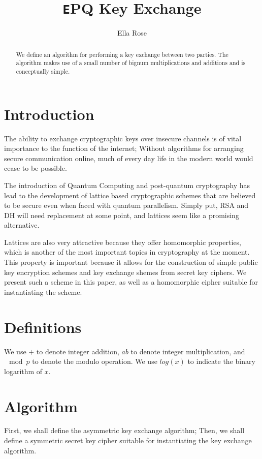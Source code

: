 \documentclass[preprint]{iacrtrans}
\author{Ella Rose\inst{1}}
\institute{Paso Robles, CA \email{python_pride@protonmail.com}}
\title[\texttt EPQ Key Exchange]{\texttt EPQ Key Exchange}
\begin{document}
\maketitle


\begin{abstract}
  We define an algorithm for performing a key exchange between two parties. The algorithm makes use of a small number of bignum multiplications and additions and is conceptually simple.\\ 
\end{abstract}

\todototoc
\listoftodos

\section{Introduction}
 The ability to exchange cryptographic keys over insecure channels is of vital importance to the function of the internet; Without algorithms for arranging secure communication online, much of every day life in the modern world would cease to be possible.

The introduction of Quantum Computing and post-quantum cryptography has lead to the development of lattice based cryptographic schemes that are believed to be secure even when faced with quantum parallelism. Simply put, RSA and DH will need replacement at some point, and lattices seem like a promising alternative.

Lattices are also very attractive because they offer homomorphic properties, which is another of the most important topics in cryptography at the moment. This property is important because it allows for the construction of simple public key encryption schemes and key exchange shemes from secret key ciphers. We present such a scheme in this paper, as well as a homomorphic cipher suitable for instantiating the scheme.

\section{Definitions}
We use $+$ to denote integer addition, $ab$ to denote integer multiplication, and $\mod p$ to denote the modulo operation. We use $log(x)$ to indicate the binary logarithm of $x$.

\section{Algorithm}
First, we shall define the asymmetric key exchange algorithm; Then, we shall define a symmetric secret key cipher suitable for instantiating the key exchange algorithm.
\end{document}
